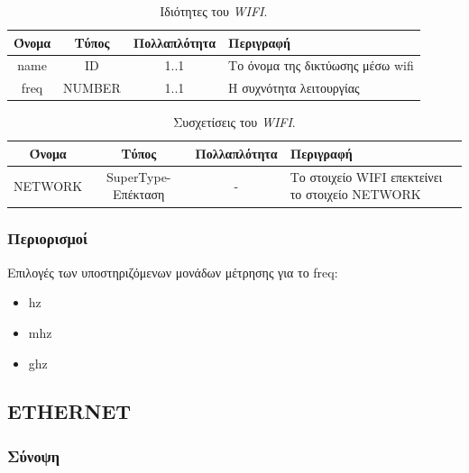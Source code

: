 \begin{table}[H]
	\begin{center}
		\caption{Ιδιότητες του \textit{WIFI}.}
		\label{tab:wifi1}
		\begin{tabular}{ | c | c | c| m{5.5cm} | }
			\hline
			\rowcolor{Gray}
			Όνομα & Τύπος & Πολλαπλότητα & Περιγραφή \\
			\hline
			name & ID & 1..1 & Το όνομα της δικτύωσης μέσω wifi \\
			\hline
			freq & NUMBER & 1..1 & Η συχνότητα λειτουργίας \\
			\hline
		\end{tabular}
	\end{center}
\end{table}

\begin{table}[H]
	\begin{center}
		\caption{Συσχετίσεις του \textit{WIFI}.}
		\label{tab:wifi2}
		\begin{tabular}{ | c | c | c| m{5.5cm} | }
			\hline
			\rowcolor{Gray}
			Όνομα & Τύπος & Πολλαπλότητα & Περιγραφή \\
			\hline
			NETWORK & SuperType-Επέκταση & - &  Το στοιχείο WIFI επεκτείνει το στοιχείο NETWORK \\
			\hline
		\end{tabular}
	\end{center}
\end{table}

\subsubsection*{Περιορισμοί}

\noindent Επιλογές των υποστηριζόμενων μονάδων μέτρησης για το freq:

\begin{itemize}[itemsep=-4pt, topsep=-8pt]
	\item hz
	\item mhz
	\item ghz
\end{itemize}

\subsection{ETHERNET}
\label{subsec:ethernet}

\subsubsection*{Σύνοψη}

